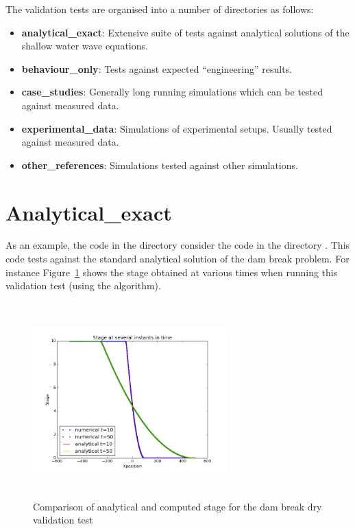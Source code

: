 \documentclass{manual}
\begin{document}
The validation tests are organised into a number of directories as follows:

\begin{itemize}
\item \textbf{analytical\_exact}: Extensive suite of tests against analytical solutions of the shallow water wave equations. 

\item \textbf{behaviour\_only}: Tests against expected ``engineering'' results.

\item \textbf{case\_studies}: Generally long running simulations which can be tested against measured data.

\item \textbf{experimental\_data}: Simulations of experimental setups. Usually tested against measured data.

\item \textbf{other\_references}: Simulations tested against other simulations. 
\end{itemize}


\section{Analytical\_exact}

As an example, the code in the 
directory  consider the code in the directory . This code tests \anuga against the standard analytical solution of the 
dam break problem. For instance Figure~\ref{fig:dam_break_stage} shows the stage obtained at various times when running this validation test (using the  algorithm). 

\begin{figure}[htp]
  \centerline{\includegraphics[width=75mm, height=75mm]
    {graphics/dambreakdrystageplot.png}}
  \caption{Comparison of analytical and computed stage for the dam break dry validation test}
  \label{fig:dam_break_stage}
\end{figure}
\end{document}
